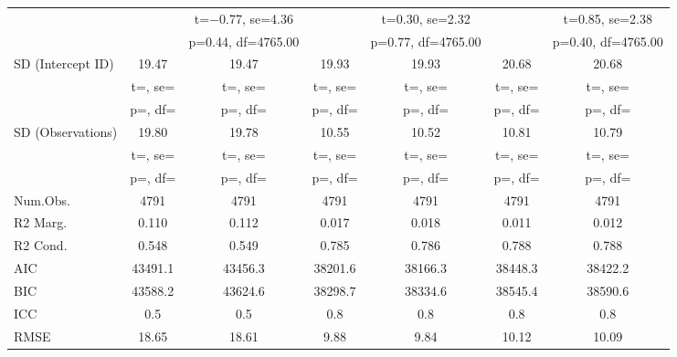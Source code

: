 \documentclass[]{report}
\begin{document}
\begin{table}
{\begin{tabular}[t]{lcccccc}
		&  & t=\num{-0.77}, se=\num{4.36} &  & t=\num{0.30}, se=\num{2.32} &  & t=\num{0.85}, se=\num{2.38}\\
		&  & p=\num{0.44}, df=\num{4765.00} &  & p=\num{0.77}, df=\num{4765.00} &  & p=\num{0.40}, df=\num{4765.00}\\
		SD (Intercept ID) & \num{19.47} & \num{19.47} & \num{19.93} & \num{19.93} & \num{20.68} & \num{20.68}\\
		& t=, se= & t=, se= & t=, se= & t=, se= & t=, se= & t=, \vphantom{1} se=\\
		& p=, df= & p=, df= & p=, df= & p=, df= & p=, df= & p=, \vphantom{1} df=\\
		SD (Observations) & \num{19.80} & \num{19.78} & \num{10.55} & \num{10.52} & \num{10.81} & \num{10.79}\\
		& t=, se= & t=, se= & t=, se= & t=, se= & t=, se= & t=, se=\\
		& p=, df= & p=, df= & p=, df= & p=, df= & p=, df= & p=, df=\\
		\midrule
		Num.Obs. & \num{4791} & \num{4791} & \num{4791} & \num{4791} & \num{4791} & \num{4791}\\
		R2 Marg. & \num{0.110} & \num{0.112} & \num{0.017} & \num{0.018} & \num{0.011} & \num{0.012}\\
		R2 Cond. & \num{0.548} & \num{0.549} & \num{0.785} & \num{0.786} & \num{0.788} & \num{0.788}\\
		AIC & \num{43491.1} & \num{43456.3} & \num{38201.6} & \num{38166.3} & \num{38448.3} & \num{38422.2}\\
		BIC & \num{43588.2} & \num{43624.6} & \num{38298.7} & \num{38334.6} & \num{38545.4} & \num{38590.6}\\
		ICC & \num{0.5} & \num{0.5} & \num{0.8} & \num{0.8} & \num{0.8} & \num{0.8}\\
		RMSE & \num{18.65} & \num{18.61} & \num{9.88} & \num{9.84} & \num{10.12} & \num{10.09}\\
		\bottomrule
	\end{tabular}}
\end{table}
\end{document}

